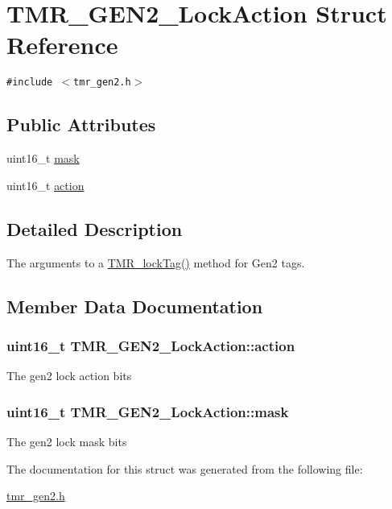 \hypertarget{struct_t_m_r___g_e_n2___lock_action}{
\section{TMR\_\-GEN2\_\-LockAction Struct Reference}
\label{struct_t_m_r___g_e_n2___lock_action}
}
{\tt \#include $<$tmr\_\-gen2.h$>$}

\subsection*{Public Attributes}
\begin{CompactItemize}
\item 
uint16\_\-t \hyperlink{struct_t_m_r___g_e_n2___lock_action_2d20405b3689bca13c8240c4d94cf649}{mask}
\item 
uint16\_\-t \hyperlink{struct_t_m_r___g_e_n2___lock_action_dfce300da2835bfdd78239f48a45582c}{action}
\end{CompactItemize}


\subsection{Detailed Description}
The arguments to a \hyperlink{group__reader_g8597458eb25df64f934016a89eac981c}{TMR\_\-lockTag()} method for Gen2 tags. 

\subsection{Member Data Documentation}
\hypertarget{struct_t_m_r___g_e_n2___lock_action_dfce300da2835bfdd78239f48a45582c}{
\subsubsection[{action}]{\setlength{\rightskip}{0pt plus 5cm}uint16\_\-t {\bf TMR\_\-GEN2\_\-LockAction::action}}}
\label{struct_t_m_r___g_e_n2___lock_action_dfce300da2835bfdd78239f48a45582c}


The gen2 lock action bits \hypertarget{struct_t_m_r___g_e_n2___lock_action_2d20405b3689bca13c8240c4d94cf649}{
\subsubsection[{mask}]{\setlength{\rightskip}{0pt plus 5cm}uint16\_\-t {\bf TMR\_\-GEN2\_\-LockAction::mask}}}
\label{struct_t_m_r___g_e_n2___lock_action_2d20405b3689bca13c8240c4d94cf649}


The gen2 lock mask bits 

The documentation for this struct was generated from the following file:\begin{CompactItemize}
\item 
\hyperlink{tmr__gen2_8h}{tmr\_\-gen2.h}\end{CompactItemize}
